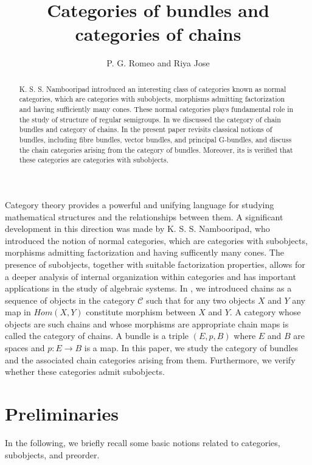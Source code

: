 \documentclass{amsart}
\title{Categories of bundles and categories of chains}
\author {P. G. Romeo and Riya Jose }
\date{}
\theoremstyle{plain}
\begin{document}
	
	\begin{abstract}
		K. S. S. Nambooripad introduced an interesting class of categories known as normal categories, which are categories with subobjects,  morphisms admitting factorization and having sufficiently many cones. These normal categories plays fundamental role in the study of structure of regular semigroups.
		In \cite{PGR} we discussed the category of chain bundles and category of chains.
		In the present paper revisits classical notions of bundles, including fibre bundles, vector bundles, and principal G-bundles, and discuss the chain categories arising from the category of bundles. Moreover, its is verified that these categories are categories with subobjects.  
		\end{abstract}
	\maketitle
	
Category theory provides a powerful and unifying language for studying mathematical structures and the relationships between them.  A significant development in this direction was made by K. S. S. Nambooripad, who introduced the notion of normal categories, which are categories with subobjects, morphisms admitting factorization and having sufficently many cones. 
The presence of subobjects, together with suitable factorization properties, allows for a deeper analysis of internal organization within categories and has important applications in the study of algebraic systems. In \cite{PGR}, we introduced chains as a sequence of objects in the category $\mathcal{C}$ such that for any two objects $X$ and $Y $ any map in $Hom(X, Y )$ constitute morphism between $X$ and $Y$. A category whose objects are such chains and whose morphisms are appropriate chain maps is called the category of chains. A bundle is a triple $(E,p,B)$ where $E$ and $B$ are spaces and $p:E \rightarrow B $ is a map. In this paper, we study the category of bundles and the associated chain categories arising from them. Furthermore, we verify whether  these categories admit subobjects.	
	
	
	
	\section{Preliminaries}
	
	In the following, we briefly recall some basic notions related to categories, subobjects, and preorder.
	
\end{document}
